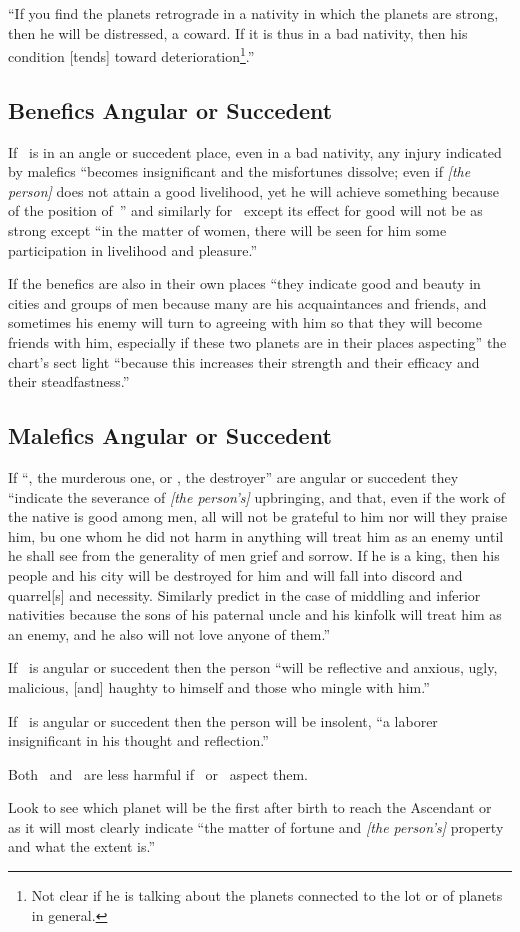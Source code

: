 ``If  you find the planets retrograde in a nativity in which the planets are strong, then he will be distressed, a coward. If it is thus in a bad nativity, then his condition [tends] toward deterioration\footnote{Not clear if he is talking about the planets connected to the lot or of planets in general.}.''

\subsection{Benefics Angular or Succedent}
If \Jupiter\, is in an angle or succedent place, even in a bad nativity, any injury indicated by malefics ``becomes insignificant and the misfortunes dissolve; even if \textsl{[the person]} does not attain a good livelihood, yet he will achieve something because of the position of \Jupiter\,'' and similarly for \Venus\, except its effect for good will not be as strong except ``in the matter of women, there will be seen for him some participation in livelihood and pleasure.''

If the benefics are also in their own places ``they indicate good and beauty in cities and groups of men because many are his acquaintances and friends, and sometimes his enemy will turn to agreeing with him so that they will become friends with him, especially \mndl if these two planets are in their places aspecting'' the chart's sect light ``because this increases their strength and their efficacy and their steadfastness.''

\subsection{Malefics Angular or Succedent}
If ``\Mars, the murderous one, or \Saturn, the destroyer'' are angular or succedent they ``indicate the severance of \textsl{[the person's]} upbringing, and that, even if the work of the native is good among men, all will not be grateful to him nor will they praise him, bu one whom he did not harm in anything will treat him as an enemy until he shall see from the generality of men grief and sorrow. If he is a king, then his people and his city will be destroyed for him and will fall into discord and quarrel[s] and necessity. Similarly predict in the case of middling and inferior nativities because the sons of his paternal uncle and his kinfolk will treat him as an enemy, and he also will not love anyone of them.''

If \Saturn\, is angular or succedent then the person ``will be reflective and anxious, ugly, malicious, [and] haughty to himself and those who mingle with him.''

If \Mars\, is angular or succedent then the person will be insolent, ``a laborer insignificant in his thought and reflection.''

Both \Saturn\, and \Mars\, are less harmful if \Jupiter\, or \Venus\,  aspect them.

Look to see which planet will be the first after birth to reach the Ascendant or \Moon\, as it will most clearly indicate ``the matter of fortune and \textsl{[the person's]} property and what the extent is.''
